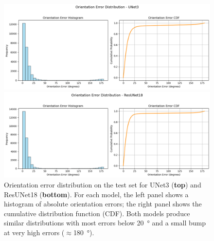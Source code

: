 \begin{figure}[htbp]
    \centering
    \includegraphics[width=\textwidth]{figures/results/3 - orientation estimation/UNet3 Orientation Error.png}

    \includegraphics[width=\textwidth]{figures/results/3 - orientation estimation/ResUNet18 Orientation Error.png}
    \caption{
        Orientation error distribution on the test set for UNet3 (\textbf{top}) and ResUNet18 (\textbf{bottom}).
        For each model, the left panel shows a histogram of absolute orientation errors; the right panel shows the cumulative distribution function (CDF).
        Both models produce similar distributions with most errors below \qty{20}{\degree} and a small bump at very high errors ($\approx$\qty{180}{\degree}).
    }
    \label{fig:orientation_error_hist_cdf}
\end{figure}